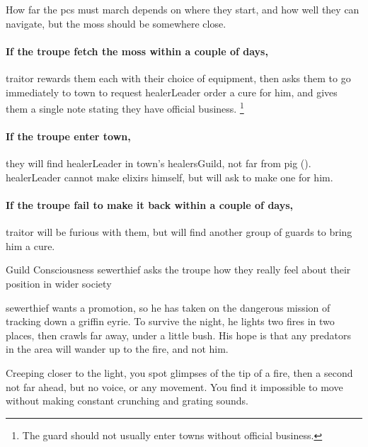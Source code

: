 How far the \glspl{pc} must march depends on where they start, and how well they can navigate,%
but the moss should be somewhere close.

\paragraph{If the troupe fetch the moss within a couple of days,}
\gls{traitor} rewards them each with their choice of equipment, then asks them to go immediately to \gls{town} to request \gls{healerLeader} order a cure for him, and gives them a single note stating they have official business.%
\footnote{The \gls{guard} should not usually enter towns without official business.}

\paragraph{If the troupe enter \gls{town},}
they will find \gls{healerLeader} in \gls{town}'s \gls{healersGuild}, not far from \gls{pig} ().
\gls{healerLeader} cannot make \glspl{elixir} himself, but will ask  to make one for him.

\paragraph{If the troupe fail to make it back within a couple of days,}
\gls{traitor} will be furious with them, but will find another group of \glspl{guard} to bring him a cure.

{Guild Consciousness}%
{\gls{sewerthief} asks the troupe how they really feel about their position in wider society}%

\Gls{sewerthief} wants a promotion, so he has taken on the dangerous mission of tracking down a griffin eyrie.
To survive the night, he lights two fires in two places, then crawls far away, under a little bush.
His hope is that any predators in the area will wander up to the fire, and not him.

\begin{boxtext}
  Creeping closer to the light, you spot glimpses of the tip of a fire, then a second not far ahead, but no voice, or any movement.
  You find it impossible to move without making constant crunching and grating sounds.
\end{boxtext}

\renewcommand\npcQuote{What was that?\ldots maybe the wind.
The wind is always playing tricks on me.}

